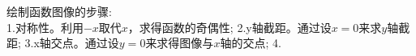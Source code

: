 \documentclass[UTF8,fontset=ubuntu]{ctexart}
\begin{document}
	绘制函数图像的步骤:\\
	1.对称性。利用$-x$取代$x$，求得函数的奇偶性;
	2.y轴截距。通过设$x=0$来求$y$轴截距;
	3.x轴交点。通过设$y=0$来求得图像与$x$轴的交点;
	4.
\end{document}
